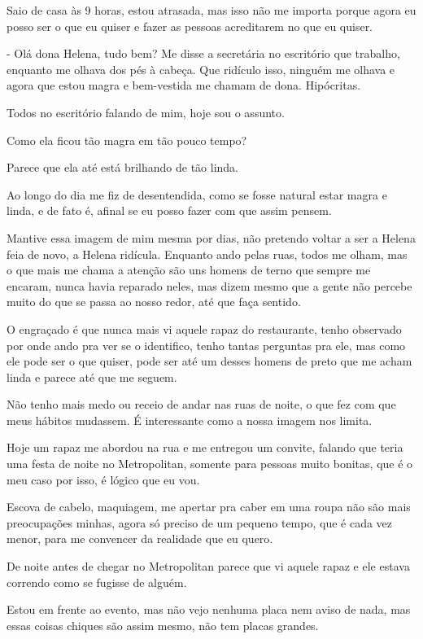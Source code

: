 Saio de casa às 9 horas, estou atrasada, mas isso não me importa porque agora eu posso ser o que eu quiser e fazer as pessoas acreditarem no que eu quiser.

- Olá dona Helena, tudo bem? Me disse a secretária no escritório que trabalho, enquanto me olhava dos pés à cabeça. Que ridículo isso, ninguém me olhava e agora que estou magra e bem-vestida me chamam de dona. Hipócritas.

Todos no escritório falando de mim, hoje sou o assunto.

Como ela ficou tão magra em tão pouco tempo?

Parece que ela até está brilhando de tão linda.

Ao longo do dia me fiz de desentendida, como se fosse natural estar magra e linda, e de fato é, afinal se eu posso fazer com que assim pensem.

Mantive essa imagem de mim mesma por dias, não pretendo voltar a ser a Helena feia de novo, a Helena ridícula. Enquanto ando pelas ruas, todos me olham, mas o que mais me chama a atenção são uns homens de terno que sempre me encaram, nunca havia reparado neles, mas dizem mesmo que a gente não percebe muito do que se passa ao nosso redor, até que faça sentido.

O engraçado é que nunca mais vi aquele rapaz do restaurante, tenho observado por onde ando pra ver se o identifico, tenho tantas perguntas pra ele, mas como ele pode ser o que quiser, pode ser até um desses homens de preto que me acham linda e parece até que me seguem.

Não tenho mais medo ou receio de andar nas ruas de noite, o que fez com que meus hábitos mudassem. É interessante como a nossa imagem nos limita.

Hoje um rapaz me abordou na rua e me entregou um convite, falando que teria uma festa de noite no Metropolitan, somente para pessoas muito bonitas, que é o meu caso por isso, é lógico que eu vou.

Escova de cabelo, maquiagem, me apertar pra caber em uma roupa não são mais preocupações minhas, agora só preciso de um pequeno tempo, que é cada vez menor, para me convencer da realidade que eu quero.

De noite antes de chegar no Metropolitan parece que vi aquele rapaz e ele estava correndo como se fugisse de alguém.

Estou em frente ao evento, mas não vejo nenhuma placa nem aviso de nada, mas essas coisas chiques são assim mesmo, não tem placas grandes.

